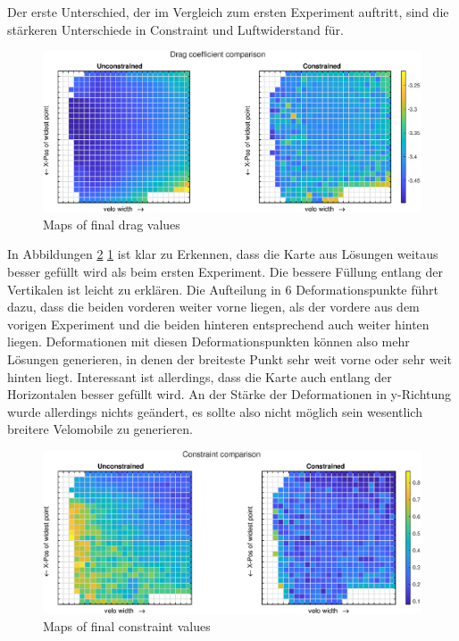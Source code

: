 Der erste Unterschied, der im Vergleich zum ersten Experiment auftritt, sind die stärkeren Unterschiede in Constraint und Luftwiderstand für.


\begin{figure}[h]
	\includegraphics[width=1\linewidth]{bilder/6pt500Samples/dragMapComparison}
	\caption{Maps of final drag values}
	\label{fig:2ndmapDrag}
\end{figure}

In Abbildungen \cref{fig:2ndmapCon} \cref{fig:2ndmapDrag} ist klar zu Erkennen, dass die Karte aus Lösungen weitaus besser gefüllt wird als beim ersten Experiment.
Die bessere Füllung entlang der Vertikalen ist leicht zu erklären.
Die Aufteilung in 6 Deformationspunkte führt dazu, dass die beiden vorderen weiter vorne liegen, als der vordere aus dem vorigen Experiment und die beiden hinteren entsprechend auch weiter hinten liegen.
Deformationen mit diesen Deformationspunkten können also mehr Lösungen generieren, in denen der breiteste Punkt sehr weit vorne oder sehr weit hinten liegt.
Interessant ist allerdings, dass die Karte auch entlang der Horizontalen  besser gefüllt wird.
An der Stärke der Deformationen in y-Richtung wurde allerdings nichts geändert, es sollte also nicht möglich sein wesentlich breitere Velomobile zu generieren.

\begin{figure}[h]
	\includegraphics[width=1\linewidth]{bilder/6pt500Samples/constraintMapComparison}
	\caption{Maps of final constraint values}
	\label{fig:2ndmapCon}
\end{figure}

